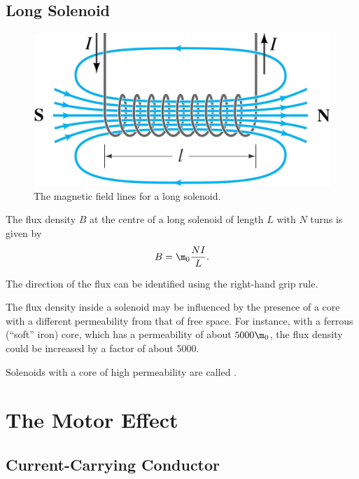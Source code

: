 \subsection{Long Solenoid}

\begin{figure}[H]
    \centering
    \includegraphics[scale=0.3]{media/Magnetic Field Lines - Solenoid.jpg}
    \caption{The magnetic field lines for a long solenoid.\protect\footnotemark}
\end{figure}

\begin{proposition}
    The flux density $B$ at the centre of a long solenoid of length $L$ with $N$ turns is given by \[B = \m_0 \frac{NI}{L}.\]
\end{proposition}

The direction of the flux can be identified using the right-hand grip rule.

The flux density inside a solenoid may be influenced by the presence of a core with a different permeability from that of free space. For instance, with a ferrous (``soft'' iron) core, which has a permeability of about $5000\m_0$, the flux density could be increased by a factor of about 5000.

Solenoids with a core of high permeability are called .

\section{The Motor Effect}

\subsection{Current-Carrying Conductor}

